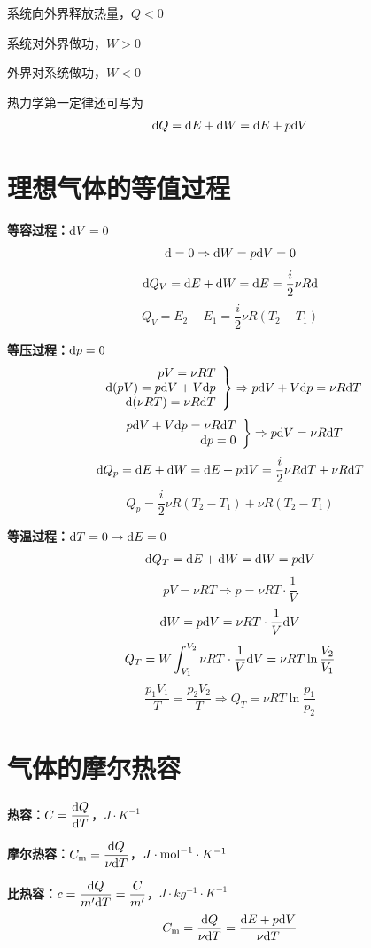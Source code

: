 \documentclass[12pt, a4paper, twoside]{ctexbook}
\begin{document}
系统向外界释放热量，$Q<0$

系统对外界做功，$W>0$

外界对系统做功，$W<0$

热力学第一定律还可写为
$$
{\rm d}Q={\rm d}E+{\rm d}W={\rm d}E+p{\rm d}V
$$

\section{理想气体的等值过程}

\textbf{等容过程：}${\rm d}V=0$
$$
{\rm d}=0\Rightarrow{\rm d}W=p{\rm d}V=0
$$
$$
{\rm d}Q_V={\rm d}E+{\rm d}W={\rm d}E=\frac{i}{2}\nu R{\rm d}
$$
$$
Q_V=E_2-E_1=\frac{i}{2}\nu R(T_2-T_1)
$$

\textbf{等压过程：}${\rm d}p=0$
$$
\left. \begin{array}{r}
	pV=\nu RT\\
	{\rm d}(pV)=p{\rm d}V+V{\rm d}p\\
	{\rm d}(\nu RT)=\nu R{\rm d}T\\
\end{array} \right\} \Rightarrow p{\rm d}V+V{\rm d}p=\nu R{\rm d}T
$$
$$
\left. \begin{array}{r}
	p{\rm d}V+V{\rm d}p=\nu R{\rm d}T \\
	{\rm d}p=0\\
\end{array} \right\} \Rightarrow p{\rm d}V=\nu R{\rm d}T
$$ 
$$
{\rm d}Q_p={\rm d}E+{\rm d}W={\rm d}E+p{\rm d}V=\frac{i}{2}\nu R{\rm d}T+\nu R{\rm d}T 
$$
$$
Q_p=\frac{i}{2}\nu R(T_2-T_1)+\nu R(T_2-T_1)
$$

\textbf{等温过程：}${\rm d}T=0\rightarrow{\rm d}E=0$
$$
{\rm d}Q_T={\rm d}E+{\rm d}W={\rm d}W=p{\rm d}V
$$
$$
pV=\nu RT\Rightarrow p=\nu RT\cdot \frac{1}{V}
$$
$$
{\rm d}W=p{\rm d}V=\nu RT\cdot\frac{1}{V}{\rm d}V
$$
$$
Q_T=W\int_{V_1}^{V_2}{\nu RT\cdot \frac{1}{V}{\rm d}V}=\nu RT\ln \frac{V_2}{V_1}
$$
$$
\frac{p_1 V_1}{T}=\frac{p_2 V_2}{T}\Rightarrow Q_T=\nu RT\ln \frac{p_1}{p_2}
$$

\section{气体的摩尔热容}
\textbf{热容：}$C=\displaystyle\frac{{\rm d}Q}{{\rm d}T}$，$J\cdot K^{-1}$

\textbf{摩尔热容：}$C_{\rm m}=\displaystyle\frac{{\rm d}Q}{\nu {\rm d}T}$，$J\cdot {\rm mol}^{-1}\cdot K^{-1}$ 

\textbf{比热容：}$c=\displaystyle\frac{{\rm d}Q}{m'{\rm d}T}=\frac{C}{m'}$，$J\cdot kg^{-1}\cdot K^{-1}$
$$
C_{\rm m}=\frac{{\rm d}Q}{\nu {\rm d}T}=\frac{{\rm d}E+p{\rm d}V}{\nu {\rm d}T}
$$
\end{document}
